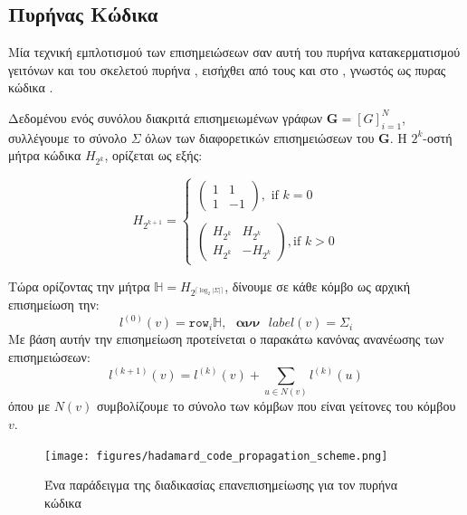 \subsection{Πυρήνας Κώδικα }
Μία τεχνική εμπλοτισμού των επισημειώσεων σαν αυτή του πυρήνα κατακερματισμού γειτόνων και του σκελετού πυρήνα , εισήχθει από τους  και  στο \cite{Kataoka}, γνωστός ως πυρας κώδικα .\par
Δεδομένου ενός συνόλου διακριτά επισημειωμένων γράφων $\mathbf{G}=[G]^{N}_{i=1}$, συλλέγουμε το σύνολο $\Sigma$ όλων των διαφορετικών επισημειώσεων του $\mathbf{G}$.
Η $2^{k}$-οστή μήτρα κώδικα  $H_{2^{k}}$, ορίζεται ως εξής:

\begin{equation}
H_{2^{k+1}}= \begin{cases}
\begin{pmatrix}
    1 & 1\\
    1 & -1
\end{pmatrix},\text{ if }k = 0
\\\\
\begin{pmatrix}
    H_{2^{k}} & H_{2^{k}}\\
    H_{2^{k}} & -H_{2^{k}}
\end{pmatrix},\text{if } k > 0
\end{cases}
\end{equation}

Τώρα ορίζοντας την μήτρα  $\mathbb{H} = H_{2^{\lceil \log_{2}|\Sigma|\rceil}}$, δίνουμε σε κάθε κόμβο ως αρχική επισημείωση την:
\begin{equation}
l^{(0)}(v) = \mathtt{row}_{i}\mathbb{H},\text{ }\textbf{ανν}\text{ }label(v) = \Sigma_{i}
\end{equation}
Με βάση αυτήν την επισημείωση προτείνεται ο παρακάτω κανόνας ανανέωσης των επισημειώσεων:
\begin{equation}
l^{(k+1)}(v) = l^{(k)}(v) + \sum_{u \in N(v)}l^{(k)}(u)
\end{equation}
όπου με $N(v)$ συμβολίζουμε το σύνολο των κόμβων που είναι γείτονες του κόμβου $v$.

\begin{figure}[]
\centering
\texttt{[image: figures/hadamard\_code\_propagation\_scheme.png]}
\caption{Ένα παράδειγμα της διαδικασίας επανεπισημείωσης για τον πυρήνα κώδικα }
\label{fig:hd_ps}
\end{figure}



